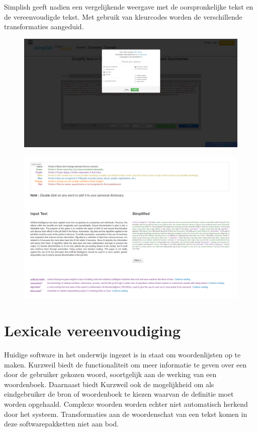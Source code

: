 Simplish geeft nadien een vergelijkende weergave met de oorspronkelijke tekst en de vereenvoudigde tekst. Met gebruik van kleurcodes worden de verschillende transformaties aangeduid.

\begin{figure}[H]
	\includegraphics[width=\linewidth]{img/simplish-input.png}
\end{figure}

\begin{figure}[H]
	\includegraphics[width=\linewidth]{img/simplish-output.png}
\end{figure}

\section{Lexicale vereenvoudiging}

Huidige software in het onderwijs ingezet is in staat om woordenlijsten op te maken. Kurzweil biedt de functionaliteit om meer informatie te geven over een door de gebruiker gekozen woord, soortgelijk aan de werking van een woordenboek. Daarnaast biedt Kurzweil ook de mogelijkheid om als eindgebruiker de bron of woordenboek te kiezen waarvan de definitie moet worden opgehaald. Complexe woorden worden echter niet automatisch herkend door het systeem. Transformaties aan de woordenschat van een tekst komen in deze softwarepakketten niet aan bod.

